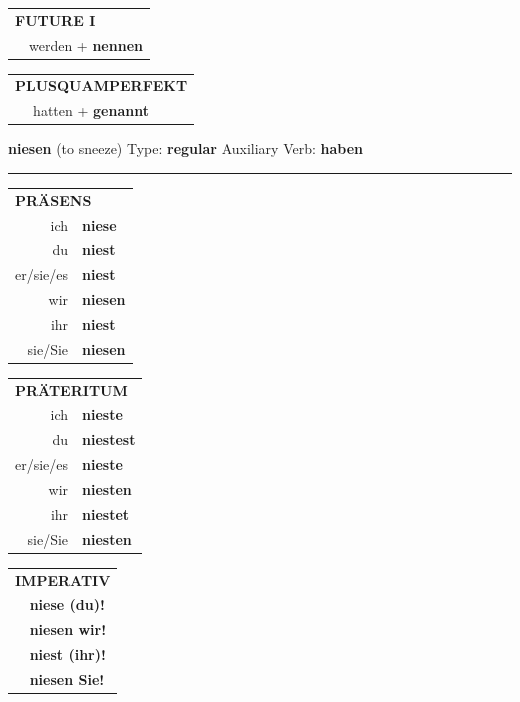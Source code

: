 \documentclass[10pt,a4paper]{revtex4-2}
\begin{document}
\begin{verbbox-acc}
\begin{tabular}{rl}
    \multicolumn{2}{l}{\textbf{FUTURE I} }\\
   & werden + \textbf{nennen}\\
 
  \end{tabular}
\hfill
   \begin{tabular}{rl}
      \multicolumn{2}{l}{\textbf{PLUSQUAMPERFEKT}}\\
   & hatten + \textbf{genannt}\\
  \end{tabular}
  
  \vspace{-5pt}


\end{verbbox-acc}

\begin{verbbox}
{\Large \bf niesen} (to sneeze) \hfill Type: \textbf{regular} \hfill Auxiliary Verb: \textbf{haben}

\vspace{5pt}
\hrule
\vspace{5pt}

\begin{tabular}{rl}
\multicolumn{2}{l}{\textbf{PRÄSENS}}\\
ich & \textbf{niese}\\
du & \textbf{niest}\\
er/sie/es & \textbf{niest}\\
wir & \textbf{niesen}\\
ihr & \textbf{niest}\\
sie/Sie & \textbf{niesen}\\
\end{tabular}
\hfill
\begin{tabular}{rl}
\multicolumn{2}{l}{\textbf{PRÄTERITUM}}\\
ich & \textbf{nieste}\\
du & \textbf{niestest}\\
er/sie/es & \textbf{nieste}\\
wir & \textbf{niesten}\\
ihr & \textbf{niestet}\\
sie/Sie & \textbf{niesten}\\
\end{tabular}
\hfill
\begin{tabular}{rl}
\multicolumn{2}{l}{\textbf{IMPERATIV}}\\
& \textbf{niese (du)!}\\
& \textbf{niesen wir!}\\
& \textbf{niest (ihr)!}\\
& \textbf{niesen Sie!}\\
\end{tabular}


\end{verbbox}
\end{document}
